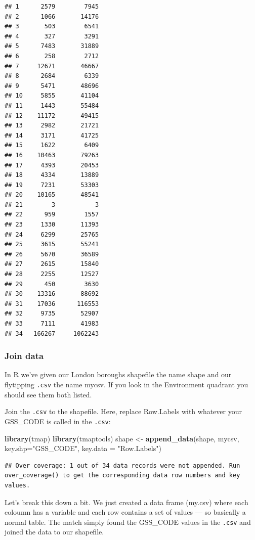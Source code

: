 \documentclass[]{book}
\newenvironment{Shaded}{\begin{snugshade}}{\end{snugshade}}
\newcommand{\DataTypeTok}[1]{\textcolor[rgb]{0.13,0.29,0.53}{#1}}
\newcommand{\KeywordTok}[1]{\textcolor[rgb]{0.13,0.29,0.53}{\textbf{#1}}}
\newcommand{\NormalTok}[1]{#1}
\newcommand{\StringTok}[1]{\textcolor[rgb]{0.31,0.60,0.02}{#1}}
\begin{document}
\begin{verbatim}
## 1      2579        7945
## 2      1066       14176
## 3       503        6541
## 4       327        3291
## 5      7483       31889
## 6       258        2712
## 7     12671       46667
## 8      2684        6339
## 9      5471       48696
## 10     5855       41104
## 11     1443       55484
## 12    11172       49415
## 13     2982       21721
## 14     3171       41725
## 15     1622        6409
## 16    10463       79263
## 17     4393       20453
## 18     4334       13889
## 19     7231       53303
## 20    10165       48541
## 21        3           3
## 22      959        1557
## 23     1330       11393
## 24     6299       25765
## 25     3615       55241
## 26     5670       36589
## 27     2615       15840
## 28     2255       12527
## 29      450        3630
## 30    13316       88692
## 31    17036      116553
## 32     9735       52907
## 33     7111       41983
## 34   166267     1062243
\end{verbatim}

\hypertarget{join-data-2}{%
\subsubsection{Join data}\label{join-data-2}}

In R we've given our London boroughs shapefile the name shape and our flytipping \texttt{.csv} the name mycsv. If you look in the Environment quadrant you should see them both listed.

Join the \texttt{.csv} to the shapefile. Here, replace Row.Labels with whatever your GSS\_CODE is called in the \texttt{.csv}:

\begin{Shaded}
\begin{Highlighting}[]
\KeywordTok{library}\NormalTok{(tmap)}
\KeywordTok{library}\NormalTok{(tmaptools)}
\NormalTok{shape <-}\StringTok{ }\KeywordTok{append_data}\NormalTok{(shape, mycsv, }\DataTypeTok{key.shp=}\StringTok{"GSS_CODE"}\NormalTok{, }\DataTypeTok{key.data =} \StringTok{"Row.Labels"}\NormalTok{)}
\end{Highlighting}
\end{Shaded}

\begin{verbatim}
## Over coverage: 1 out of 34 data records were not appended. Run over_coverage() to get the corresponding data row numbers and key values.
\end{verbatim}

Let's break this down a bit. We just created a data frame (my.csv) where each coloumn has a variable and each row contains a set of values --- so basically a normal table. The match simply found the GSS\_CODE values in the \texttt{.csv} and joined the data to our shapefile.
\end{document}
